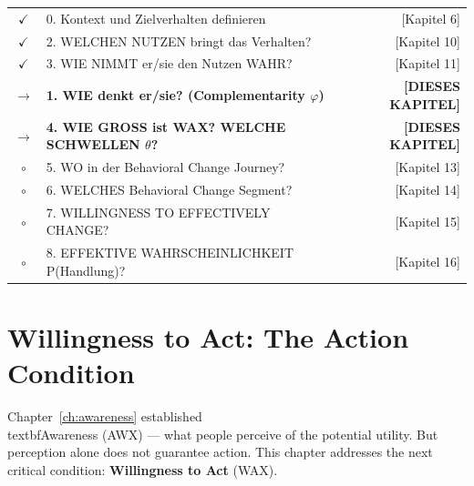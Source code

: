 

\begin{tcolorbox}[
  title={\textbf{Die 9 Fragen des EBF — Kapitelnavigation}},
  colback=blue!3,
  colframe=blue!50!black,
  fonttitle=\bfseries\sffamily,
  coltitle=white,
  boxrule=0.8pt,
  arc=2mm
]
\small\sffamily
\begin{tabular}{@{}clr@{}}
$\checkmark$ & 0. Kontext und Zielverhalten definieren & [Kapitel 6] \\
$\checkmark$ & 2. WELCHEN NUTZEN bringt das Verhalten? & [Kapitel 10] \\
$\checkmark$ & 3. WIE NIMMT er/sie den Nutzen WAHR? & [Kapitel 11] \\[3pt]
\rowcolor{blue!10}
$\rightarrow$ & \textbf{1. WIE denkt er/sie? (Complementarity $\varphi$)} & \textbf{[DIESES KAPITEL]} \\
\rowcolor{blue!10}
$\rightarrow$ & \textbf{4. WIE GROSS ist WAX? WELCHE SCHWELLEN $\theta$?} & \textbf{[DIESES KAPITEL]} \\[3pt]
$\circ$ & 5. WO in der Behavioral Change Journey? & [Kapitel 13] \\
$\circ$ & 6. WELCHES Behavioral Change Segment? & [Kapitel 14] \\
$\circ$ & 7. WILLINGNESS TO EFFECTIVELY CHANGE? & [Kapitel 15] \\
$\circ$ & 8. EFFEKTIVE WAHRSCHEINLICHKEIT P(Handlung)? & [Kapitel 16] \\
\end{tabular}
\end{tcolorbox}

\section{Willingness to Act: The Action Condition}
\label{sec:willingness-intro}

Chapter~\ref{ch:awareness} established \\textbf{Awareness} (AWX) — what people perceive 
of the potential utility. But perception alone does not guarantee action. 
This chapter addresses the next critical condition: \textbf{Willingness to Act} (WAX).

